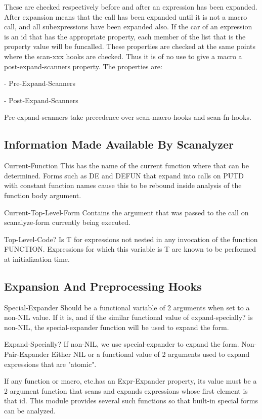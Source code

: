   These are checked respectively before and after an expression
has been expanded. After expansion means that the call has been
expanded until it is not a macro call, and all subexpressions
have been expanded also.  If the car of an expression is an id
that has the appropriate property, each member of the list that
is the property value will be funcalled. These properties are
checked at the same points where the scan-xxx hooks are checked.
Thus it is of no use to give a macro a post-expand-scanners
property. The properties are:
   
			- Pre-Expand-Scanners

   - Post-Expand-Scanners

  Pre-expand-scanners take precedence over scan-macro-hooks and
scan-fn-hooks.

\subsection{Information Made Available By Scanalyzer}

Current-Function This has the name of the current function where
that can be determined. Forms such as DE and DEFUN that expand into
calls on PUTD with constant function names cause this to be rebound
inside analysis of the function body argument.

Current-Top-Level-Form Contains the argument that was passed to
the call on scanalyze-form currently being executed.

Top-Level-Code? Is T for expressions not nested in any invocation of
the function FUNCTION. Expressions for which this variable is T are
known to be performed at initialization time.


\subsection{Expansion And Preprocessing Hooks}

Special-Expander Should  be a functional variable of 2 arguments
when set to a non-NIL value. If it is, and if the similar functional
value of expand-specially? is non-NIL, the special-expander function
will be used to expand the form.

Expand-Specially? If non-NIL, we use special-expander to expand the
form. Non-Pair-Expander Either NIL or a functional value of 2
arguments used to expand expressions that are "atomic".


  If any function or macro, etc.has an Expr-Expander property,
its value must be a 2 argument function that scans and expands
expressions whose first element is that id. This module
provides several such functions so that built-in special forms
can be analyzed.


